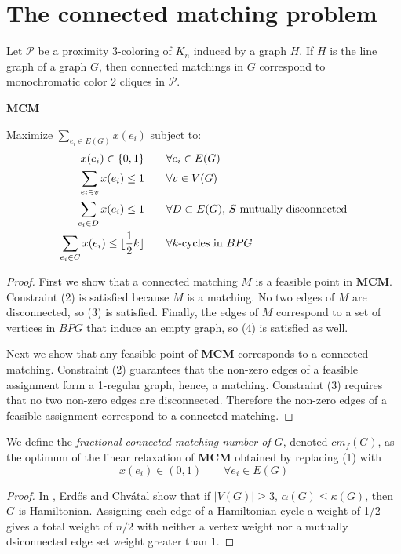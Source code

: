 %
%

\section{The connected matching problem}

Let $\mathcal{P}$ be a proximity $3$-coloring of $K_n$ induced by a graph $H$.  If $H$ is the line graph of a graph $G$, then connected matchings in $G$ correspond to monochromatic color 2 cliques in $\mathcal{P}$.  

\noindent\textbf{MCM}

\noindent Maximize $\displaystyle \sum_{e_i \in E(G)} x(e_i)$ subject to: 
\begin{align}
	x(e_i) \in \{0,1\} \qquad &\forall e_i \in E(G)\\
	\sum_{e_i \ni v} x(e_i) \leq 1 \qquad &\forall v\in V(G)\\
	\sum_{e_i \in D} x(e_i) \leq 1 \qquad &\forall D\subset E(G)\makebox{, $S$ mutually disconnected}\\
	\sum_{e_i \in C} x(e_i) \leq \lfloor \frac{1}{2}k\rfloor \qquad& \forall \makebox{$k$-cycles in $BPG$}
\end{align} 
\begin{proof}
	First we show that a connected matching $M$ is a feasible point in \textbf{MCM}.  Constraint (2) is satisfied because $M$ is a matching.  No two edges of $M$ are disconnected, so (3) is satisfied.  Finally, the edges of $M$ correspond to a set of vertices in $BPG$ that induce an empty graph, so (4) is satisfied as well.

Next we show that any feasible point of \textbf{MCM} corresponds to a connected matching.  Constraint (2) guarantees that the non-zero edges of a feasible assignment form a 1-regular graph, hence, a matching.  Constraint (3) requires that no two non-zero edges are disconnected.  Therefore the non-zero edges of a feasible assignment correspond to a connected matching.    
\end{proof}

We define the \textit{fractional connected matching number of $G$}, denoted $cm_f(G)$, as the optimum of the linear relaxation of \textbf{MCM} obtained by replacing (1) with
\begin{equation*}\tag{$1'$}x(e_i) \in (0,1) \qquad \forall e_i \in E(G)\end{equation*}

\begin{proof}
	In \cite{MR0297600}, Erd\H{o}s and Chv{\'a}tal show that if $|V(G)| \geq 3$, $\alpha(G) \leq \kappa(G)$, then $G$ is Hamiltonian.  Assigning each edge of a Hamiltonian cycle a weight of 1/2 gives a total weight of $n/2$ with neither a vertex weight nor a mutually dsiconnected edge set weight greater than 1.
\end{proof}

%
